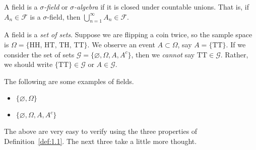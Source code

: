 \documentclass[11pt,fleqn]{book} %
\begin{document}
\begin{definition} \label{def:1.2}
	A field is a \emph{$\sigma$-field} or \emph{$\sigma$-algebra} if it is closed under countable unions. That is, if $A_n \in \mathcal{F}$ is a $\sigma$-field, then $\bigcup_{n=1}^\infty A_n \in \mathcal{F}$.
\end{definition}

\begin{remark} \label{rem:1.1}
	A field is a \emph{set of sets}. Suppose we are flipping a coin twice, so the sample space is $\Omega = \{\textrm{HH, HT, TH, TT}\}$. We observe an event $A \subset \Omega$, say $A = \{\textrm{TT}\}$. If we consider the set of sets $\mathcal{G} = \{\varnothing, \Omega, A, A^c\}$, then we \emph{cannot} say $\textrm{TT} \in \mathcal{G}$. Rather, we should write $\{\textrm{TT}\} \in \mathcal{G}$ or $A \in \mathcal{G}$.
\end{remark}

The following are some examples of fields.

\begin{itemize}
	\item $\{\varnothing, \Omega\}$
	\item $\{\varnothing, \Omega, A, A^c\}$
\end{itemize}

The above are very easy to verify using the three properties of Definition~\ref{def:1.1}. The next three take a little more thought.
\end{document}

